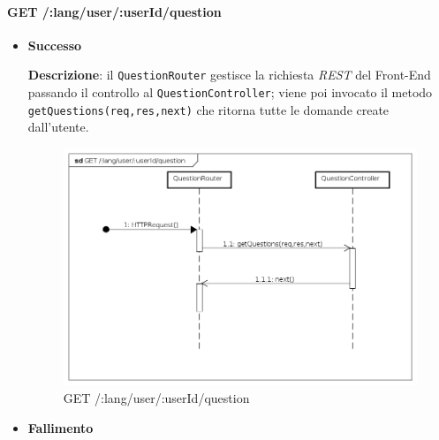
\paragraph{GET /:lang/user/:userId/question}
\begin{itemize}
\item \textbf{Successo}

\textbf{Descrizione}: il \texttt{QuestionRouter} gestisce la richiesta \textit{REST} del Front-End passando il controllo al \texttt{QuestionController}; viene poi invocato il metodo\\ \texttt{getQuestions(req,res,next)} che ritorna tutte le domande create dall'utente.

\begin{figure}[ht]
	\centering
	\includegraphics[scale=0.45]{UML/DiagrammiDiSequenza/Back-end/GET__lang_user__userId_question.png}
	\caption{GET /:lang/user/:userId/question}
\end{figure}
\FloatBarrier

\item \textbf{Fallimento}
\end{itemize}

